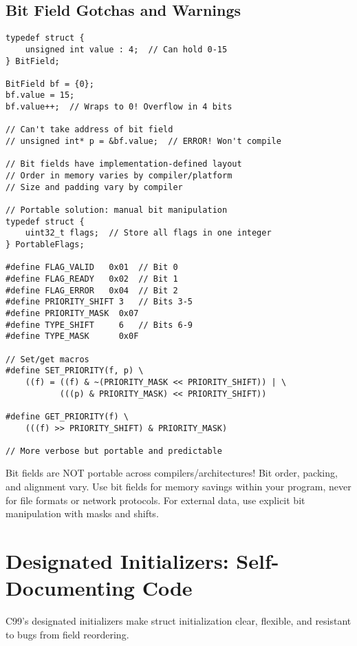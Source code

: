 \subsection{Bit Field Gotchas and Warnings}

\begin{lstlisting}
typedef struct {
    unsigned int value : 4;  // Can hold 0-15
} BitField;

BitField bf = {0};
bf.value = 15;
bf.value++;  // Wraps to 0! Overflow in 4 bits

// Can't take address of bit field
// unsigned int* p = &bf.value;  // ERROR! Won't compile

// Bit fields have implementation-defined layout
// Order in memory varies by compiler/platform
// Size and padding vary by compiler

// Portable solution: manual bit manipulation
typedef struct {
    uint32_t flags;  // Store all flags in one integer
} PortableFlags;

#define FLAG_VALID   0x01  // Bit 0
#define FLAG_READY   0x02  // Bit 1
#define FLAG_ERROR   0x04  // Bit 2
#define PRIORITY_SHIFT 3   // Bits 3-5
#define PRIORITY_MASK  0x07
#define TYPE_SHIFT     6   // Bits 6-9
#define TYPE_MASK      0x0F

// Set/get macros
#define SET_PRIORITY(f, p) \
    ((f) = ((f) & ~(PRIORITY_MASK << PRIORITY_SHIFT)) | \
           (((p) & PRIORITY_MASK) << PRIORITY_SHIFT))

#define GET_PRIORITY(f) \
    (((f) >> PRIORITY_SHIFT) & PRIORITY_MASK)

// More verbose but portable and predictable
\end{lstlisting}

\begin{warningbox}
Bit fields are NOT portable across compilers/architectures! Bit order, packing, and alignment vary. Use bit fields for memory savings within your program, never for file formats or network protocols. For external data, use explicit bit manipulation with masks and shifts.
\end{warningbox}

\section{Designated Initializers: Self-Documenting Code}

C99's designated initializers make struct initialization clear, flexible, and resistant to bugs from field reordering.

